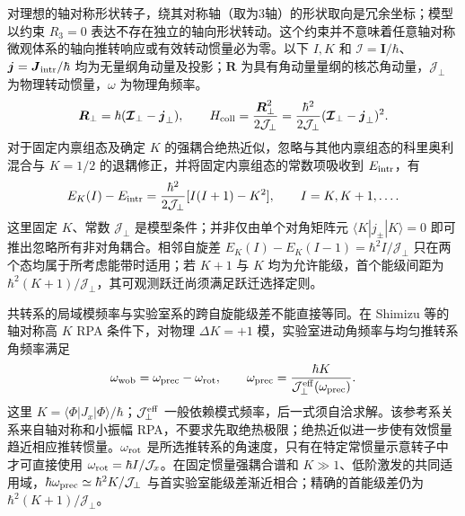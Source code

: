 对理想的轴对称形状转子，绕其对称轴（取为3轴）的形状取向是冗余坐标；模型以约束 $R_3=0$ 表达不存在独立的轴向形状转动。这个约束并不意味着任意轴对称微观体系的轴向推转响应或有效转动惯量必为零。以下 $I,K$ 和 $\boldsymbol{\mathcal I}=\boldsymbol I/\hbar$、$\boldsymbol j=\boldsymbol J_{\rm intr}/\hbar$ 均为无量纲角动量及投影；$\boldsymbol R$ 为具有角动量量纲的核芯角动量，$\mathcal J_\perp$ 为物理转动惯量，$\omega$ 为物理角频率。
\begin{equation}
 \boldsymbol R_\perp=\hbar(\boldsymbol{\mathcal I}_\perp-\boldsymbol j_\perp),\qquad
 H_{\rm coll}=\frac{\boldsymbol R_\perp^2}{2\mathcal J_\perp}
 =\frac{\hbar^2}{2\mathcal J_\perp}(\boldsymbol{\mathcal I}_\perp-\boldsymbol j_\perp)^2.
\end{equation}
对于固定内禀组态及确定 $K$ 的强耦合绝热近似，忽略与其他内禀组态的科里奥利混合与 $K=1/2$ 的退耦修正，并将固定内禀组态的常数项吸收到 $E_{\rm intr}$，有
\begin{equation}
 E_K(I)-E_{\rm intr}=\frac{\hbar^2}{2\mathcal J_\perp}[I(I+1)-K^2],\qquad I=K,K+1,\ldots .
\end{equation}
这里固定 $K$、常数 $\mathcal J_\perp$ 是模型条件；并非仅由单个对角矩阵元 $\langle K|j_\pm|K\rangle=0$ 即可推出忽略所有非对角耦合。相邻自旋差 $E_K(I)-E_K(I-1)=\hbar^2I/\mathcal J_\perp$ 只在两个态均属于所考虑能带时适用；若 $K+1$ 与 $K$ 均为允许能级，首个能级间距为 $\hbar^2(K+1)/\mathcal J_\perp$，其可观测跃迁尚须满足跃迁选择定则。

共转系的局域模频率与实验室系的跨自旋能级差不能直接等同。在 Shimizu 等的轴对称高 $K$ RPA 条件下，对物理 $\Delta K=+1$ 模，实验室进动角频率与均匀推转系角频率满足
\begin{equation}
 \omega_{\rm wob}=\omega_{\rm prec}-\omega_{\rm rot},\qquad
 \omega_{\rm prec}=\frac{\hbar K}{\mathcal J_\perp^{\rm eff}(\omega_{\rm prec})}.
\end{equation}
这里 $K=\langle\Phi|J_x|\Phi\rangle/\hbar$；$\mathcal J_\perp^{\rm eff}$ 一般依赖模式频率，后一式须自洽求解。该参考系关系来自轴对称和小振幅 RPA，不要求先取绝热极限；绝热近似进一步使有效惯量趋近相应推转惯量。$\omega_{\rm rot}$ 是所选推转系的角速度，只有在特定常惯量示意转子中才可直接使用 $\omega_{\rm rot}=\hbar I/\mathcal J_x$。在固定惯量强耦合谱和 $K\gg1$、低阶激发的共同适用域，$\hbar\omega_{\rm prec}\simeq\hbar^2K/\mathcal J_\perp$ 与首实验室能级差渐近相合；精确的首能级差仍为 $\hbar^2(K+1)/\mathcal J_\perp$。


